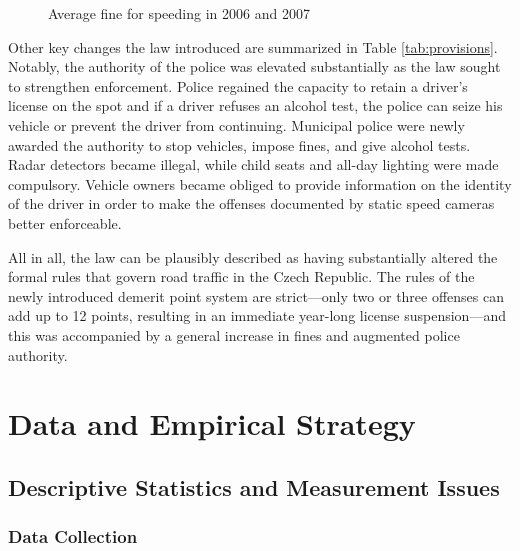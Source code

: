 \documentclass[12pt]{article}
\begin{document}
\begin{figure}[t]
  \caption{Average fine for speeding in 2006 and 2007}
  \label{fig:fines}
\end{figure}

Other key changes the law introduced are summarized in Table
\ref{tab:provisions}. Notably, the authority of the police was elevated
substantially as the law sought to strengthen enforcement. Police regained the
capacity to retain a driver's license on the spot and if a driver refuses an
alcohol test, the police can seize his vehicle or prevent the driver from
continuing. Municipal police were newly awarded the authority to stop vehicles,
impose fines, and give alcohol tests.  Radar detectors became illegal, while
child seats and all-day lighting were made compulsory. Vehicle owners became
obliged to provide information on the identity of the driver in order to make
the offenses documented by static speed cameras better enforceable. 

All in all, the law can be plausibly described as having substantially altered
the formal rules that govern road traffic in the Czech Republic. The rules of
the newly introduced demerit point system are strict---only two or three
offenses can add up to 12 points, resulting in an immediate year-long license
suspension---and this was accompanied by a general increase in fines and
augmented police authority. 

\section*{Data and Empirical Strategy} %
\label{sec:data-and-strategy}

\subsection{Descriptive Statistics and Measurement Issues} %
\label{subsec:descriptive-statistics}

\subsubsection{Data Collection} %
\end{document}
